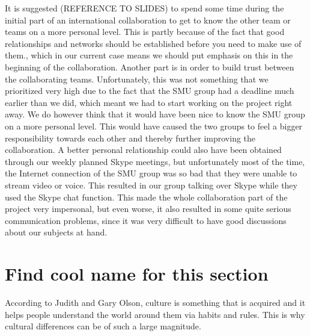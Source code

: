 It is suggested (REFERENCE TO SLIDES) to spend some time during the initial part of an international collaboration to get to know the other team or teams on a more personal level. This is partly because of the fact that good relationships and networks should be established before you need to make use of them., which in our current case means we should put emphasis on this in the beginning of the collaboration. Another part is in order to build trust between the collaborating teams. Unfortunately, this was not something that we prioritized very high due to the fact that the SMU group had a deadline much earlier than we did, which meant we had to start working on the project right away. We do however think that it would have been nice to know the SMU group on a more personal level. This would have caused the two groups to feel a bigger responsibility towards each other and thereby further improving the collaboration. A better personal relationship could also have been obtained through our weekly planned Skype meetings, but unfortunately most of the time, the Internet connection of the SMU group was so bad that they were unable to stream video or voice. This resulted in our group talking over Skype while they used the Skype chat function. This made the whole collaboration part of the project very impersonal, but even worse, it also resulted in some quite serious communication problems, since it was very difficult to have good discussions about our subjects at hand.


\section{Find cool name for this section}

According to Judith and Gary Olson, culture is something that is acquired and it helps people understand the world around them via habits and rules. This is why cultural differences can be of such a large magnitude.
 
